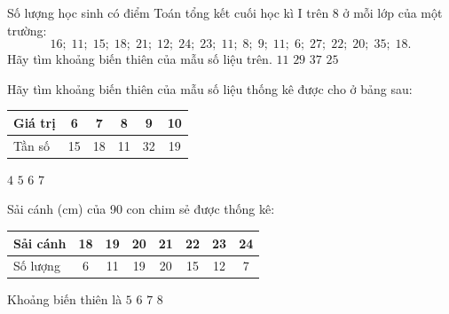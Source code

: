 \begin{ex}
	Số lượng học sinh có điểm Toán tổng kết cuối học kì I trên 8 ở mỗi lớp của một trường:
	\[16;\; 11;\; 15;\; 18;\; 21;\; 12;\; 24;\; 23;\; 11;\; 8;\; 9;\; 11;\; 6;\; 27;\; 22;\; 20;\; 35;\; 18.\]
	Hãy tìm khoảng biến thiên của mẫu số liệu trên.
	\choice
	{$11$}
	{\True $29$}
	{$37$}
	{$25$}
\end{ex}

\begin{ex}
	Hãy tìm khoảng biến thiên của mẫu số liệu thống kê được cho ở bảng sau:
	\begin{center}
	\begin{tabular}{|l|c|c|c|c|c|}
		\hline
		Giá trị & 6 & 7 & 8 & 9 & 10 \\
		\hline
		Tần số & 15 & 18 & 11 & 32 & 19 \\
		\hline
	\end{tabular}
	\end{center}
	\choice
	{\True $4$}
	{$5$}
	{$6$}
	{$7$}
\end{ex}

\begin{ex}
	Sải cánh (cm) của 90 con chim sẻ được thống kê:
	\begin{center}
	\begin{tabular}{|l|c|c|c|c|c|c|c|}
		\hline
		Sải cánh & 18 & 19 & 20 & 21 & 22 & 23 & 24 \\
		\hline
		Số lượng & 6 & 11 & 19 & 20 & 15 & 12 & 7 \\
		\hline
	\end{tabular}
	\end{center}
	Khoảng biến thiên là
	\choice
	{$5$}
	{\True $6$}
	{$7$}
	{$8$}
\end{ex}

